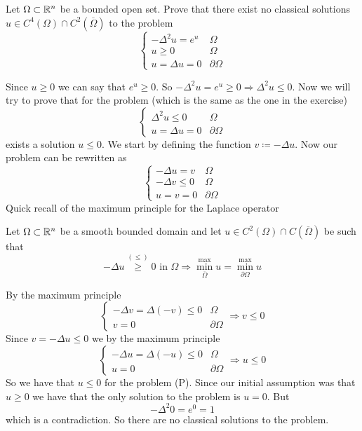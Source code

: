 \newpage
\begin{exercise}
    Let \(\Omega \subset \mathbb{R}^n\) be a bounded open set. Prove that there exist no classical solutions \(u \in C^4(\Omega) \cap C^2(\overline{\Omega})\) to the problem
    \[
        \begin{cases}
            -\Delta^2 u = e^u & \Omega \\
            u \geq 0 & \Omega \\
            u = \Delta u = 0 & \partial\Omega
        \end{cases}
    \]
\end{exercise}
Since \(u \geq 0\) we can say that \(e^u \geq 0\). So \(- \Delta^2 u = e^u \geq 0 \Rightarrow \Delta^2 u \leq 0\). Now we will try to prove that for the problem (which is the same as the one in the exercise) 
\[
    \begin{cases}
        \Delta^2 u \leq 0 & \Omega \\
        u = \Delta u = 0 & \partial\Omega
    \end{cases}
    \tag*{(P)}
\]
exists a solution \(u \leq 0\). We start by defining the function \(v \coloneqq -\Delta u\). 
Now our problem can be rewritten as
\[
    \begin{cases}
        -\Delta u = v & \Omega \\
        -\Delta v \leq 0 & \Omega \\
        u = v = 0 & \partial\Omega
    \end{cases}
\]
Quick recall of the maximum principle for the Laplace operator
\begin{remark}
    Let \(\Omega \subset \mathbb{R}^n\) be a smooth bounded domain and let \(u \in C^2(\Omega) \cap C(\overline{\Omega})\) be such that \[-\Delta u \overset{(\leq)}{\geq} 0 \text{ in } \Omega \Rightarrow \overset{\max}{\min_{\overline{\Omega}}} u = \overset{\max}{\min_{\partial\Omega}} u\]
\end{remark}
By the maximum principle 
\[
    \begin{cases}
        -\Delta v = \Delta (- v) \leq 0 & \Omega \\
        v = 0 & \partial\Omega
    \end{cases}
    \Rightarrow v \leq 0
\]
Since \(v = -\Delta u \leq 0\) we by the maximum principle
\[
    \begin{cases}
        -\Delta u = \Delta(-u) \leq 0 & \Omega \\
        u = 0 & \partial\Omega
    \end{cases}
    \Rightarrow u \leq 0
\]
So we have that \(u \leq 0\) for the problem (P). Since our initial assumption was that \(u \geq 0\) we have that the only solution to the problem is \(u = 0\). But 
\[
        -\Delta^2 0 = e^0 = 1 
\]
which is a contradiction. So there are no classical solutions to the problem.

